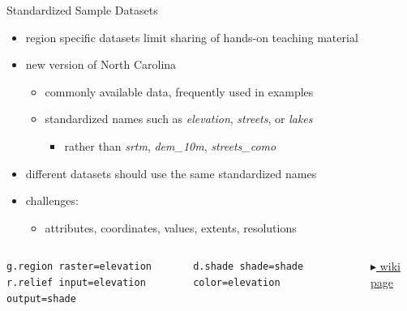 \documentclass[xcolor={dvipsnames,usenames},beamer,aspectratio=169]{beamer}
\begin{document}
\begin{frame}[fragile]{Standardized Sample Datasets}

\begin{itemize}
 \item region specific datasets limit sharing of hands-on teaching material
 \item new version of North Carolina
 \begin{itemize}
  \item commonly available data, frequently used in examples
  \item standardized names such as \textit{elevation}, \textit{streets}, or \textit{lakes}
  \begin{itemize}
   \item rather than \textit{srtm}, \textit{dem\_10m}, \textit{streets\_como}
  \end{itemize}
 \end{itemize}
 \item \alert{different datasets should use the same standardized names}
 \item challenges:
 \begin{itemize}
  \item attributes, coordinates, values, extents, resolutions
 \end{itemize}

\end{itemize}

\smallskip

\begin{columns}[c]

\scriptsize
\begin{verbatim}
g.region raster=elevation
r.relief input=elevation output=shade
\end{verbatim}
\begin{verbatim}
d.shade shade=shade color=elevation
\end{verbatim}
\vfill\hfill\hfill
\href{http://grasswiki.osgeo.org/wiki/GRASS_GIS_Standardized_Sample_Datasets}{%
$\blacktriangleright$ wiki page}


\end{columns}
\end{frame}
\end{document}
